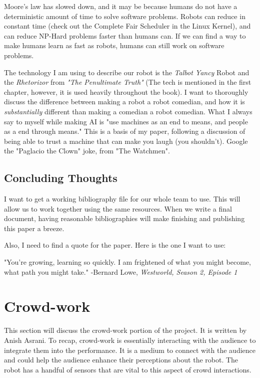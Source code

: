 \documentclass[onecolumn, draftclsnofoot,10pt, compsoc]{IEEEtran}
\begin{document}
	Moore's law has slowed down, and it may be because humans do not have a deterministic amount of time to solve software problems. Robots can reduce in constant time (check out the Complete Fair Scheduler in the Linux Kernel), and can reduce NP-Hard problems faster than humans can. If we can find a way to make humans learn as fast as robots, humans can still work on software problems.

	The technology I am using to describe our robot is the \textit{Talbot Yancy} Robot and the \textit{Rhetorizor} from \textit{"The Penultimate Truth"} (The tech is mentioned in the first chapter, however, it is used heavily throughout the book). I want to thoroughly discuss the difference between making a robot a robot comedian, and how it is \textit{substantially} different than making a comedian a robot comedian. What I always say to myself while making AI is "use machines as an end to means, and people as a end through means." This is a basis of my paper, following a discussion of being able to trust a machine that can make you laugh (you shouldn't). Google the "Paglacio the Clown" joke, from "The Watchmen".

\subsection{Concluding Thoughts}
 I want to get a working bibliography file for our whole team to use. This will allow us to work together using the same resources. When we write a final document, having reasonable bibliographies will make finishing and publishing this paper a breeze.


 Also, I need to find a quote for the paper. Here is the one I want to use:


 \begin{displayquote}
	 "You're growing, learning so quickly. I am frightened of what you might become, what path you might take."
	 -Bernard Lowe, \textit{Westworld, Season 2, Episode 1}
 \end{displayquote}



\section{Crowd-work}
This section will discuss the crowd-work portion of the project. It is written by Anish Asrani. To recap, crowd-work is essentially interacting with the audience to integrate them into the performance. It is a medium to connect with the audience and could help the audience enhance their perceptions about the robot. The robot has a handful of sensors that are vital to this aspect of crowd interactions. 
\end{document}
